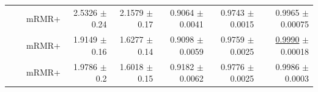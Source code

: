 \begin{longtable}{llp{}rrrrr}
 &  & mRMR+ & 2.5326 {\scriptsize $\pm$ 0.24} & 2.1579 {\scriptsize $\pm$ 0.17} & 0.9064 {\scriptsize $\pm$ 0.0041} & 0.9743 {\scriptsize $\pm$ 0.0015} & 0.9965 {\scriptsize $\pm$ 0.00075} \\
 &  & mRMR+ & 1.9149 {\scriptsize $\pm$ 0.16} & 1.6277 {\scriptsize $\pm$ 0.14} & 0.9098 {\scriptsize $\pm$ 0.0059} & 0.9759 {\scriptsize $\pm$ 0.0025} & \underline{0.9990} {\scriptsize $\pm$ 0.00018} \\
 &  & mRMR+ & 1.9786 {\scriptsize $\pm$ 0.2} & 1.6018 {\scriptsize $\pm$ 0.15} & 0.9182 {\scriptsize $\pm$ 0.0062} & 0.9776 {\scriptsize $\pm$ 0.0025} & 0.9986 {\scriptsize $\pm$ 0.0003} \\
\end{longtable}